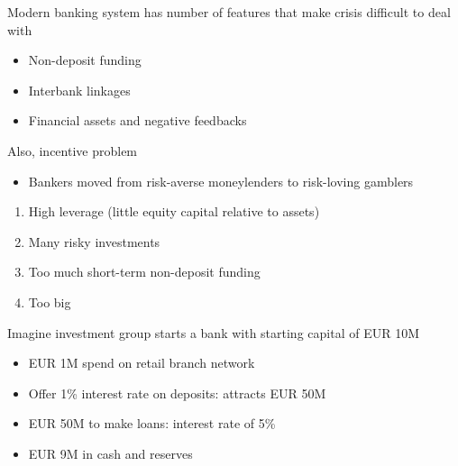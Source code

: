 \documentclass{beamer}
\begin{document}
\begin{frame}
 Modern banking system has number of features that make crisis difficult to deal with
\begin{itemize}
  \item Non-deposit funding
  \item Interbank linkages
  \item Financial assets and negative feedbacks  
\end{itemize}
\end{frame}

\begin{frame}
 Also, incentive problem
 \begin{itemize}
   \item Bankers moved from risk-averse moneylenders to risk-loving gamblers
 \end{itemize}
\begin{enumerate}
  \item High leverage (little equity capital relative to assets)
  \item Many risky investments
  \item Too much short-term non-deposit funding
  \item Too big
\end{enumerate}
\end{frame}

\begin{frame}
  Imagine investment group starts a bank with starting capital of EUR 10M
\begin{itemize}
  \item EUR 1M spend on retail branch network
  \item Offer 1\% interest rate on deposits: attracts EUR 50M
  \item EUR 50M to make loans: interest rate of 5\%
  \item EUR 9M in cash and reserves
\end{itemize}
\end{frame}
\end{document}

